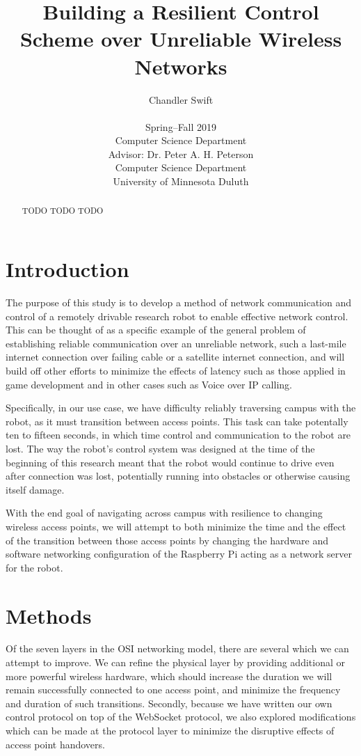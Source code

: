 \documentclass{IEEEtran}
\title{Building a Resilient Control Scheme over Unreliable Wireless Networks}
\author{Chandler Swift \\ ~ \\
  Spring--Fall 2019 \\
  Computer Science Department \\
  Advisor: Dr. Peter A. H. Peterson \\
  Computer Science Department \\
  University of Minnesota Duluth
}
\begin{document}
\maketitle

\begin{abstract}
TODO TODO TODO
\end{abstract}

\section{Introduction}
The purpose of this study is to develop a method of network communication and
control of a remotely drivable research robot to enable effective network
control. This can be thought of as a specific example of the general problem
of establishing reliable communication over an unreliable network, such a
last-mile internet connection over failing cable or a satellite internet
connection, and will build off other efforts to minimize the effects of
latency such as those applied in game development\cite{reducinglag} and in other
cases such as Voice over IP calling\cite{briscoe2014reducing}.

Specifically, in our use case, we have difficulty reliably traversing campus
with the robot, as it must transition between access points. This task can take
potentally ten to fifteen seconds, in which time control and communication to
the robot are lost. The way the robot's control system was designed at the time
of the beginning of this research meant that the robot would continue to drive
even after connection was lost, potentially running into obstacles or
otherwise causing itself damage.

With the end goal of navigating across campus with resilience to changing
wireless access points, we will attempt to both minimize the time and the
effect of the transition between those access points by changing the
hardware and software networking configuration of the Raspberry Pi acting
as a network server for the robot.

\section{Methods}
Of the seven layers in the OSI networking model, there are several which we
can attempt to improve. We can refine the physical layer by providing additional or
more powerful wireless hardware, which should increase the duration we will
remain successfully connected to one access point, and minimize the frequency
and duration of such transitions. Secondly, because we have written our own
control protocol on top of the WebSocket protocol\cite{protocol}, we also 
explored modifications which can be made at the
protocol layer to minimize the disruptive effects of access point handovers.
\end{document}

